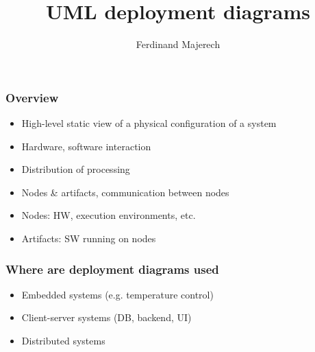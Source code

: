 \documentclass{beamer}
\begin{document}
\title{UML deployment diagrams}
\author{Ferdinand Majerech}

\begin{frame}[plain] 
  \titlepage
\end{frame}



\begin{frame}\frametitle{Overview}

\begin{itemize}
\item
  High-level static view of a physical configuration of a system
\item
  Hardware, software interaction
\item
  Distribution of processing
\item
  Nodes \& artifacts, communication between nodes
\item
  Nodes: HW, execution environments, etc.
\item
  Artifacts: SW running on nodes
\end{itemize}

\end{frame}

\begin{frame}\frametitle{Where are deployment diagrams used}

\begin{itemize}
\item
  Embedded systems (e.g. temperature control)
\item
  Client-server systems (DB, backend, UI)
\item
  Distributed systems
\end{itemize}

\end{frame}
\end{document}
